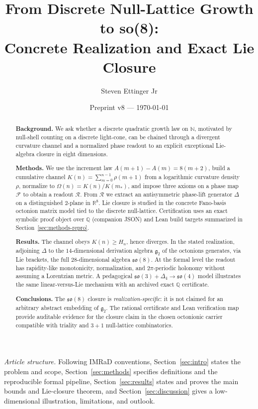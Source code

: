 \documentclass[11pt]{amsart}
\title[Discrete Growth to so(8)]{From Discrete Null-Lattice Growth to so(8):\\
Concrete Realization and Exact Lie Closure}
\author{Steven Ettinger Jr}
\date{Preprint v8 --- \today}
\begin{document}
\begin{abstract}
\noindent\textbf{Background.}
We ask whether a discrete quadratic growth law on \(\mathbb{N}\), motivated by null-shell counting on a discrete light-cone, can be chained through a divergent curvature channel and a normalized phase readout to an explicit exceptional Lie-algebra closure in eight dimensions.

\noindent\textbf{Methods.}
We use the increment law \(A(m+1)-A(m)=8(m+2)\), build a cumulative channel \(K(n)=\sum_{m=0}^{n-1}\rho(m+1)\) from a logarithmic curvature density \(\rho\), normalize to \(\Omega(n)=K(n)/K(m_\ast)\), and impose three axioms on a phase map \(\mathcal{F}\) to obtain a readout \(\mathcal{R}\). From \(\mathcal{R}\) we extract an antisymmetric phase-lift generator \(\Delta\) on a distinguished \(2\)-plane in \(\mathbb{R}^8\). Lie closure is studied in the concrete Fano-basis octonion matrix model tied to the discrete null-lattice. Certification uses an exact symbolic proof object over \(\mathbb{Q}\) (companion JSON) and Lean build targets summarized in Section~\ref{sec:methods-repro}.

\noindent\textbf{Results.}
The channel obeys \(K(n)\ge H_n\), hence diverges. In the stated realization, adjoining \(\Delta\) to the \(14\)-dimensional derivation algebra \(\mathfrak{g}_2\) of the octonions generates, via Lie brackets, the full \(28\)-dimensional algebra \(\mathfrak{so}(8)\). At the formal level the readout has rapidity-like monotonicity, normalization, and \(2\pi\)-periodic holonomy without assuming a Lorentzian metric. A pedagogical \(\mathfrak{so}(3)+\Delta_4\to\mathfrak{so}(4)\) model illustrates the same linear-versus-Lie mechanism with an archived exact \(\mathbb{Q}\) certificate.

\noindent\textbf{Conclusions.}
The \(\mathfrak{so}(8)\) closure is \emph{realization-specific}: it is not claimed for an arbitrary abstract embedding of \(\mathfrak{g}_2\). The rational certificate and Lean verification map provide auditable evidence for the closure claim in the chosen octonionic carrier compatible with triality and \(3{+}1\) null-lattice combinatorics.
\end{abstract}
\maketitle

\noindent\textit{Article structure.}
Following IMRaD conventions, Section~\ref{sec:intro} states the problem and scope, Section~\ref{sec:methods} specifies definitions and the reproducible formal pipeline, Section~\ref{sec:results} states and proves the main bounds and Lie-closure theorem, and Section~\ref{sec:discussion} gives a low-dimensional illustration, limitations, and outlook.
\end{document}
